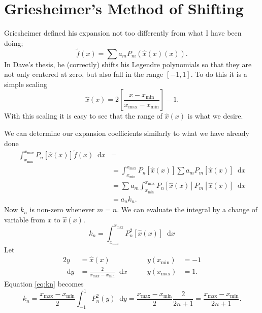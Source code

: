 \documentclass[12pt]{article}
\newcommand{\xmax}{x_{\max}}
\newcommand{\xmin}{x_{\min}}
\newcommand{\xg}{2\left[ \frac{x-\xmin}{\xmax - \xmin} \right] - 1}
\newcommand{\dd}{\mathop{}\!\mathrm{d}}
\begin{document}
\section{Griesheimer's Method of Shifting}
Griesheimer defined his expansion not too differently from what I have been doing;
\begin{equation}
    \tilde{f}(x) = \sum a_mP_m\!\left(\hat{x}(x)(x)\right).
    \label{eq:GrExpansion}
\end{equation}
In Dave's thesis, he (correctly) shifts his Legendre polynomials so that they are not only centered at zero, but also fall in the range $[-1,1]$.  To do this it is a simple scaling
\begin{equation}
    \hat{x}(x) = \xg.
    \label{eq:xScaled}
\end{equation}
With this scaling it is easy to see that the range of $\hat{x}(x)$ is what we desire.

We can determine our expansion coefficients similarly to what we have already done
\begin{equation}
    \begin{split}
        \int_{\xmin}^{\xmax} P_n\!\left[\hat{x}(x)\right]\tilde{f}(x) \dd x &= \\
        &= \int_{\xmin}^{\xmax} P_n\!\left[\hat{x}(x)\right] \sum a_mP_m\!\left[ \hat{x}(x) \right] \dd x \\
         &=  \sum a_m\int_{\xmin}^{\xmax} P_n\!\left[ \hat{x}(x) \right]P_m\!\left[ \hat{x}(x) \right] \dd x \\
         &=  a_nk_n.
    \end{split}
    \label{eq:CoeffsG}
\end{equation}
Now $k_n$ is non-zero whenever $m = n$.  We can evaluate the integral by a change of variable from $x$ to $\hat{x}(x)$.
\begin{equation}
    k_n = \int_{\xmin}^{\xmax} P_n^2\left[ \hat{x}(x) \right] \dd x \label{eq:kn}
\end{equation}
Let 
\begin{alignat}{2}
    y &= \hat{x}(x) & \qquad y\!\left(\xmin\right) &= -1 \\
    \dd y &= \frac{2}{\xmax - \xmin} \dd x & \qquad y\!\left(\xmax\right) &= 1.
\end{alignat}
Equation \eqref{eq:kn} becomes
\begin{equation}
    k_n = \frac{\xmax-\xmin}{2}\int_{-1}^{1} P_n^2\left( y \right) \dd y = \frac{\xmax-\xmin}{2}\frac{2}{2n+1} = \frac{\xmax-\xmin}{2n+1}.
\end{equation}
\end{document}
